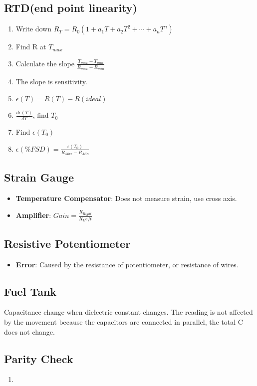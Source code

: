 \documentclass{article}
\begin{document}
	\subsection{RTD(end point linearity)}
	\begin{enumerate}
		\item Write down $R_T = R_0(1+a_1T + a_2T^2 + \cdots + a_nT^n)$
		\item Find R at $T_{max}$
		\item Calculate the slope $\frac{T_{max}-T_{min}}{R_{max} - R_{min}}$
		\item The slope is sensitivity.
		\item $\epsilon(T) = R(T) - R(ideal)$
		\item $\frac{d\epsilon (T)}{dT}$, find $T_0$
		\item Find $\epsilon (T_0)$
		\item $\epsilon(\% FSD) = \frac{\epsilon (T_0)}{R_{Max} - R_{Min}}$
	\end{enumerate}
	
	\subsection{Strain Gauge}
	\begin{itemize}
		\item \textbf{Temperature Compensator}: Does not measure strain, use cross axis.
		\item \textbf{Amplifier}: $Gain = \frac{R_{Right}}{R_Left}$
	\end{itemize}
	
	\subsection{Resistive Potentiometer}
	\begin{itemize}
		\item \textbf{Error}: Caused by the resistance of potentiometer, or resistance of wires.
	\end{itemize}
	
	\subsection{Fuel Tank}
	Capacitance change when dielectric constant changes. The reading is not affected by the movement because the capacitors are connected in parallel, the total C does not change.
	
	
	\subsection{Parity Check}
	\begin{enumerate}
		\item 
	\end{enumerate}
	
\end{document}
